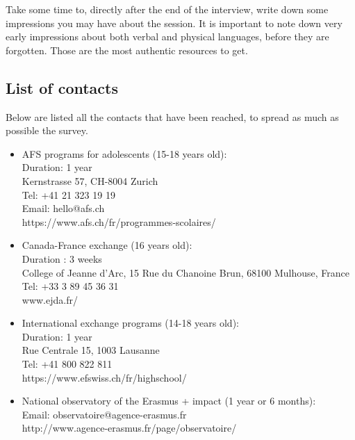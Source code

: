 Take some time to, directly after the end of the interview, write down some impressions you may have about the session. It is important to note down very early impressions about both verbal and physical languages, before they are forgotten. Those are the most authentic resources to get.




\subsection{List of contacts}
\label{appendix:contacts_list}
Below are listed all the contacts that have been reached, to spread as much as possible the survey.

\begin{itemize}
\item AFS programs for adolescents (15-18 years old): \\
Duration: 1 year \\
Kernstrasse 57, CH-8004 Zurich \\
Tel: +41 21 323 19 19 \\
Email: hello@afs.ch \\
https://www.afs.ch/fr/programmes-scolaires/ 

\vspace{4pt}
\item Canada-France exchange (16 years old): \\
Duration : 3 weeks \\
College of Jeanne d'Arc, 15 Rue du Chanoine Brun, 68100 Mulhouse, France \\
Tel: +33 3 89 45 36 31 \\
www.ejda.fr/ 

\vspace{4pt}
\item International exchange programs (14-18 years old): \\
Duration: 1 year \\
Rue Centrale 15, 1003 Lausanne \\
Tel: +41 800 822 811 \\
https://www.efswiss.ch/fr/highschool/ 

\vspace{4pt}
\item National observatory of the Erasmus + impact (1 year or 6 months): \\
Email: observatoire@agence-erasmus.fr \\
http://www.agence-erasmus.fr/page/observatoire/


\end{itemize}
